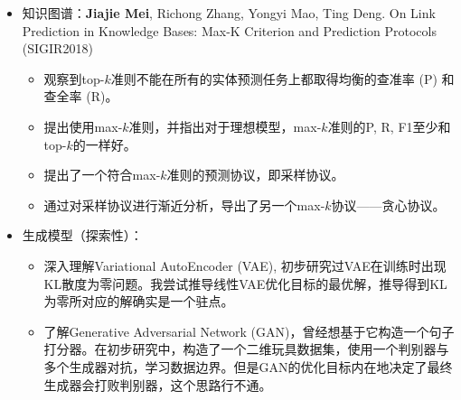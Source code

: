 \documentclass{resume}
\begin{document}
\begin{itemize}
	\item 知识图谱：{\bf Jiajie Mei}, Richong Zhang, Yongyi Mao, Ting Deng. On Link Prediction in Knowledge Bases: Max-K Criterion and Prediction Protocols (SIGIR2018)
	\begin{itemize}
		\item 观察到top-$k$准则不能在所有的实体预测任务上都取得均衡的查准率 (P) 和查全率 (R)。
		\item 提出使用max-$k$准则，并指出对于理想模型，max-$k$准则的P, R, F1至少和top-$k$的一样好。
		\item 提出了一个符合max-$k$准则的预测协议，即采样协议。
		\item 通过对采样协议进行渐近分析，导出了另一个max-$k$协议——贪心协议。
	\end{itemize}
\item 生成模型（探索性）：
\begin{itemize}
	\item 深入理解Variational AutoEncoder (VAE), 初步研究过VAE在训练时出现KL散度为零问题。我尝试推导线性VAE优化目标的最优解，推导得到KL为零所对应的解确实是一个驻点。
	\item 了解Generative Adversarial Network (GAN)，曾经想基于它构造一个句子打分器。在初步研究中，构造了一个二维玩具数据集，使用一个判别器与多个生成器对抗，学习数据边界。但是GAN的优化目标内在地决定了最终生成器会打败判别器，这个思路行不通。
\end{itemize}


\end{itemize}
\end{document}
